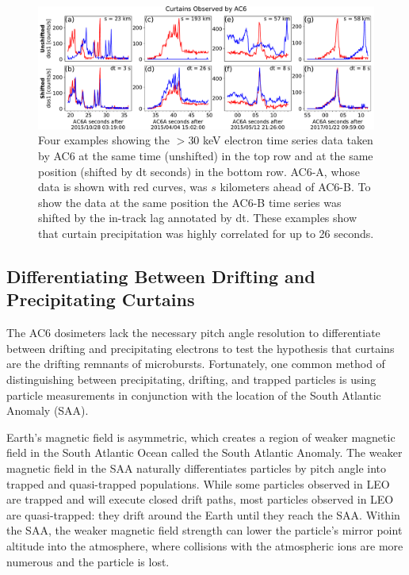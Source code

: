 \documentclass[draft]{agujournal2019}
\begin{document}
\begin{figure}
\includegraphics[width=\textwidth]{fig1.pdf}
\caption{Four examples showing the $>30$ keV electron time series data taken by AC6 at the same time (unshifted) in the top row and at the same position (shifted by dt seconds) in the bottom row. AC6-A, whose data is shown with red curves, was $s$ kilometers ahead of AC6-B. To show the data at the same position the AC6-B time series was shifted by the in-track lag annotated by dt. These examples show that curtain precipitation was highly correlated for up to 26 seconds.}
\label{fig1}
\end{figure}

\subsection{Differentiating Between Drifting and Precipitating Curtains}

The AC6 dosimeters lack the necessary pitch angle resolution to differentiate between drifting and precipitating electrons to test the  hypothesis that curtains are the drifting remnants of microbursts. Fortunately, one common method of distinguishing between precipitating, drifting, and trapped particles is using particle measurements in conjunction with the location of the South Atlantic Anomaly (SAA).

Earth's magnetic field is asymmetric, which creates a region of weaker magnetic field in the South Atlantic Ocean called the South Atlantic Anomaly. The weaker magnetic field in the SAA naturally differentiates particles by pitch angle into trapped and quasi-trapped populations. While some particles observed in LEO are trapped and will execute closed drift paths, most particles observed in LEO are quasi-trapped: they drift around the Earth until they reach the SAA. Within the SAA, the weaker magnetic field strength can lower the particle's mirror point altitude into the atmosphere, where collisions with the atmospheric ions are more numerous and the particle is lost. 
\end{document}

